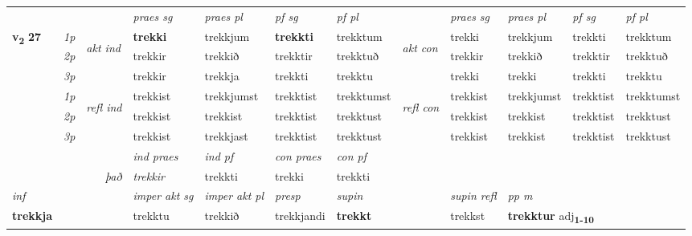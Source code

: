 \begin{longtable}[l]{X>{\footnotesize\itshape}llXXXXlXXXX}
\midrule

 & &   & \textit{praes sg}  & \textit{praes pl}    & \textit{ pf sg} & \textit{pf pl} & & \textit{praes sg}  & \textit{praes pl}    & \textit{pf sg} & \textit{pf pl }  \\ \cmidrule{4-7} \cmidrule{9-12}
 \multirow{2}{*}{{{\textbf{v{\textsubscript{2}}} \Large{\textbf{27}}}}}  & 1p & \multirow{3}{*}{\begin{turn}{90}\textit{akt ind}\end{turn}} & \textbf{trekki} & trekkjum & \textbf{trekkti} & trekktum & \multirow{3}{*}{\begin{turn}{90}\textit{akt con}\end{turn}} &trekki & trekkjum & trekkti & trekktum\\*
 & 2p &  &  trekkir  & trekkið & trekktir & trekktuð & & trekkir & trekkið & trekktir & trekktuð \\*
 & 3p &  & trekkir & trekkja & trekkti & trekktu & & trekki & trekki& trekkti & trekktu \\*
\cmidrule{4-7} \cmidrule{9-12}
 & 1p & \multirow{3}{*}{\begin{turn}{90}\textit{refl ind}\end{turn}}  & trekkist & trekkjumst & trekktist & trekktumst & \multirow{3}{*}{\begin{turn}{90}\textit{refl con}\end{turn}}  &trekkist & trekkjumst & trekktist & trekktumst \\*
 & 2p &  & trekkist & trekkist & trekktist & trekktust & &trekkist & trekkist & trekktist & trekktust \\*
 & 3p  & & trekkist & trekkjast & trekktist & trekktust & & trekkist & trekkist& trekktist & trekktust \\*
\cmidrule{4-7} \cmidrule{9-12}

   && &  \textit{ind praes} & \textit{ind pf} & \textit{con praes} & \textit{con pf} \\*
\multicolumn{3}{r}{\textit{það}} & trekkir & trekkti & trekki & trekkti \\*

\cmidrule{4-7}
   {\textit{inf}} & &  & \textit{imper akt sg} & \textit{imper akt pl}   & \textit{presp} & \textit{supin} && \textit{supin refl} & \textit{pp m} \\*
  {\textbf{trekkja}} & && trekktu  & trekkið   & trekkjandi &  \textbf{trekkt} && trekkst & \multicolumn{2}{l}{\textbf{trekktur} adj\textbf{\textsubscript{1-10}}} \\*


\end{longtable}

